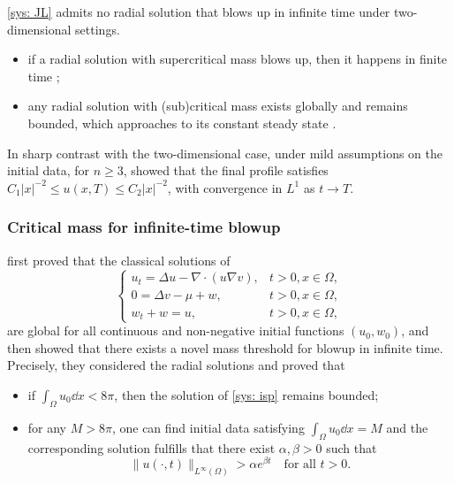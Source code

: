 
\begin{frame}
\eqref{sys: JL} admits no radial solution that blows up in infinite time under two-dimensional settings.
\begin{itemize}
\item if a radial solution with supercritical mass blows up, then it happens in finite time ;
\item any radial solution with (sub)critical mass exists globally and remains bounded, which approaches to its constant steady state .
\end{itemize}
In sharp contrast with the two-dimensional case, 
under mild assumptions on the initial data, for $n \geq 3$,  showed that the final profile satisfies $C_1|x|^{-2} \leq u(x, T) \leq C_2|x|^{-2}$, with convergence in $L^1$ as $t \rightarrow T$.
\end{frame}


\begin{frame}
\frametitle{Critical mass for infinite-time blowup}
  first proved that the classical solutions of 
 \begin{equation}\tag{ISP}
\begin{cases}
	\label{sys: isp}
		u_t = \Delta u - \nabla \cdot(u\nabla v),&  t>0, x\in\Omega,\\
		0 =  \Delta v - \mu + w,&  t>0, x\in\Omega,	\\
		w_t + w = u, &  t > 0, x\in\Omega,
\end{cases}
\end{equation}
are global for all continuous and non-negative initial functions $(u_0, w_0)$, and then showed that there exists a novel mass threshold for blowup in infinite time. Precisely, they considered the radial solutions and proved that
\begin{itemize}
\item if $\int_\Omega u_0\dd{x} < 8\pi$, then the solution of \eqref{sys: isp} remains bounded;
\item for any $M > 8\pi$, one can find initial data satisfying $\int_\Omega u_0\dd{x} = M$ and the corresponding solution fulfills that there exist $\alpha,\beta > 0$ such that
\[
\|{u(\cdot, t)}\|_{L^\infty(\Omega)} > \alpha e^{\beta t} \quad\text{for all } t>0.
\]
\end{itemize}
\end{frame}

